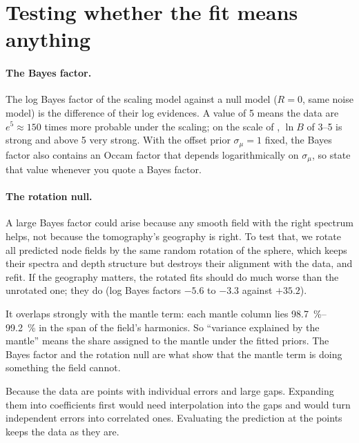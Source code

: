 \section{Testing whether the fit means anything}

\paragraph{The Bayes factor.}
The log Bayes factor of the scaling model against a null model ($R=0$, same noise model) is the difference of their log evidences.
A value of 5 means the data are $e^5\approx150$ times more probable under the scaling; on the scale of \citet{kass_bayes_1995}, $\ln B$ of 3--5 is strong and above 5 very strong. With the offset prior $\sigma_\mu=1$ fixed, the Bayes factor also contains an Occam factor that depends logarithmically on $\sigma_\mu$, so state that value whenever you quote a Bayes factor.

\paragraph{The rotation null.}
A large Bayes factor could arise because any smooth field with the right spectrum helps, not because the tomography's geography is right.
To test that, we rotate all predicted node fields by the same random rotation of the sphere, which keeps their spectra and depth structure but destroys their alignment with the data, and refit.
If the geography matters, the rotated fits should do much worse than the unrotated one; they do (log Bayes factors $-5.6$ to $-3.3$ against $+35.2$).

\begin{defence}
\A It overlaps strongly with the mantle term: each mantle column lies \qtyrange{98.7}{99.2}{\percent} in the span of the field's harmonics.
So ``variance explained by the mantle'' means the share assigned to the mantle under the fitted priors.
The Bayes factor and the rotation null are what show that the mantle term is doing something the field cannot.

\A Because the data are points with individual errors and large gaps.
Expanding them into coefficients first would need interpolation into the gaps and would turn independent errors into correlated ones.
Evaluating the prediction at the points keeps the data as they are.
\end{defence}
